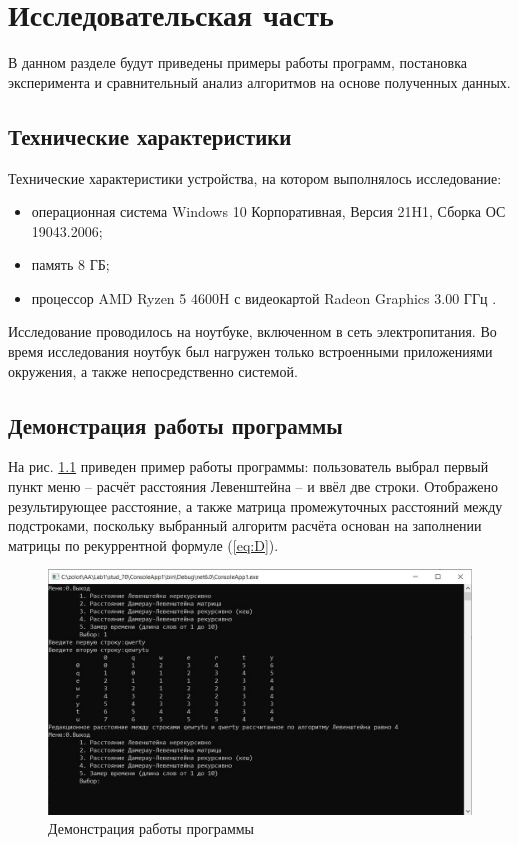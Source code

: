 \chapter{Исследовательская часть}

В данном разделе будут приведены примеры работы программ, постановка эксперимента и сравнительный анализ алгоритмов на основе полученных данных.

\section{Технические характеристики}

Технические характеристики устройства, на котором выполнялось исследование:

\begin{itemize}
	\item операционная система Windows 10 Корпоративная, Версия	21H1, Сборка ОС 19043.2006;
	\item память 8 ГБ;
	\item процессор AMD Ryzen 5 4600H с видеокартой Radeon Graphics 3.00 ГГц \cite{processor}.
\end{itemize}

Исследование проводилось на ноутбуке, включенном в сеть электропитания. Во время исследования ноутбук был нагружен только встроенными приложениями окружения, а также непосредственно системой.

\section{Демонстрация работы программы}

На рис. \ref{fig:--2022-09-25-195051} приведен пример работы программы: пользователь выбрал первый пункт меню -- расчёт расстояния Левенштейна -- и ввёл две строки. Отображено результирующее расстояние, а также матрица промежуточных расстояний между подстроками, поскольку выбранный алгоритм расчёта основан на заполнении матрицы по рекуррентной формуле (\ref{eq:D}).
\begin{figure}[H]
	\centering
	\includegraphics[width=01\linewidth]{"inc/img/Снимок экрана 2022-09-25 195051"}
	\caption{Демонстрация работы программы}
	\label{fig:--2022-09-25-195051}
\end{figure}

